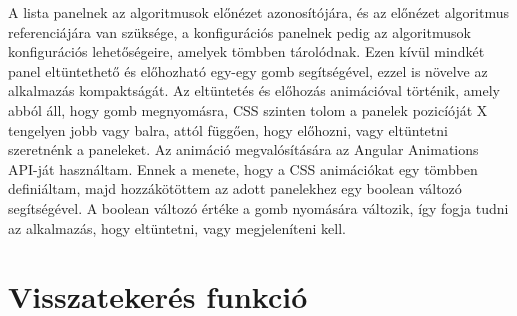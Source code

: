 A lista panelnek az algoritmusok előnézet azonosítójára, és az előnézet algoritmus referenciájára van szüksége, a konfigurációs panelnek pedig az algoritmusok konfigurációs lehetőségeire, amelyek tömbben tárolódnak. Ezen kívül mindkét panel eltüntethető és előhozható egy-egy gomb segítségével, ezzel is növelve az alkalmazás kompaktságát. Az eltüntetés és előhozás animációval történik, amely abból áll, hogy gomb megnyomásra, CSS szinten tolom a panelek pozicíóját X tengelyen jobb vagy balra, attól függően, hogy előhozni, vagy eltüntetni szeretnénk a paneleket. Az animáció megvalósítására az Angular Animations API-ját használtam. Ennek a menete, hogy a CSS animációkat egy tömbben definiáltam, majd hozzákötöttem az adott panelekhez egy boolean változó segítségével. A boolean változó értéke a gomb nyomására változik, így fogja tudni az alkalmazás, hogy eltüntetni, vagy megjeleníteni kell.


\section{Visszatekerés funkció}

